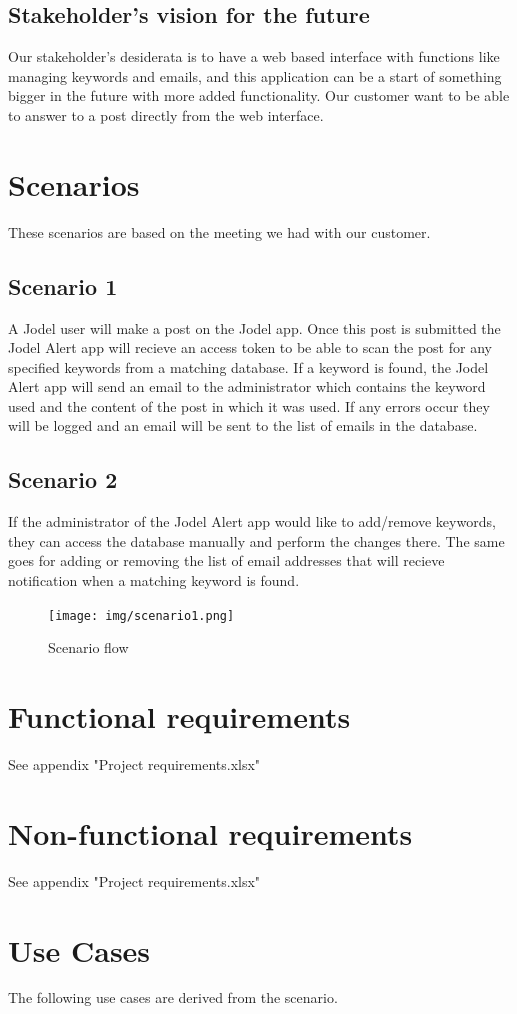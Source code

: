 \documentclass[a4paper,12pt]{article}
\begin{document}
\subsection{Stakeholder's vision for the future}
Our stakeholder's desiderata is to have a web based interface with functions like managing keywords and emails, and this application can be a start of something bigger in the future with more added functionality.
Our customer want to be able to answer to a post directly from the web interface.
\section{Scenarios}
These scenarios are based on the meeting we had with our customer.
\subsection{Scenario 1}
A Jodel user will make a post on the Jodel app. Once this post is submitted the Jodel Alert app will recieve an access token to be able to scan the post for any specified keywords from a matching database. If a keyword is found, the Jodel Alert app will send an email to the administrator which contains the keyword used and the content of the post in which it was used. If any errors occur they will be logged and an email will be sent to the list of emails in the database.
\subsection{Scenario 2}
If the administrator of the Jodel Alert app would like to add/remove keywords, they can access the database manually and perform the changes there. The same goes for adding or removing the list of email addresses that will recieve notification when a matching keyword is found.
\begin{figure}[!h]
	\centering
	\texttt{[image: img/scenario1.png]}
	\caption{Scenario flow}
\end{figure}
\section{Functional requirements}
See appendix "Project requirements.xlsx"
\section{Non-functional requirements}
See appendix "Project requirements.xlsx"
\clearpage
\section{Use Cases}
The following use cases are derived from the scenario.
\end{document}
